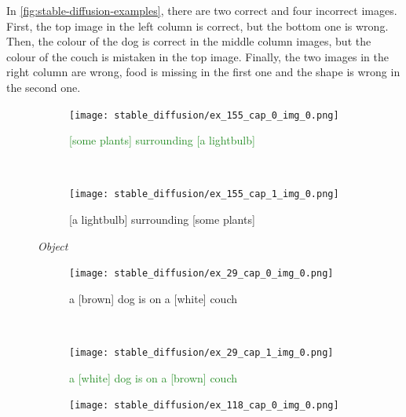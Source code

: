 In \cref{fig:stable-diffusion-examples}, there are two correct and four incorrect images. First, the top image in the left column is correct, but the bottom one is wrong. Then, the colour of the dog is correct in the middle column images, but the colour of the couch is mistaken in the top image. Finally, the two images in the right column are wrong, food is missing in the first one and the shape is wrong in the second one.

\begin{figure}[ht]
\centering
    \begin{minipage}[t]{.30\textwidth}
        \begin{subfigure}[t]{\textwidth}
        \centering
        \texttt{[image: stable\_diffusion/ex\_155\_cap\_0\_img\_0.png]}
        \caption{\textcolor{ForestGreen}{[some plants] surrounding [a lightbulb] \cmark}}
        \end{subfigure}\\
        \begin{subfigure}[t]{\textwidth}
        \centering
        \texttt{[image: stable\_diffusion/ex\_155\_cap\_1\_img\_0.png]}
        \caption{\textcolor{BrickRed}{[a lightbulb] surrounding [some plants] \xmark}}
        \end{subfigure}%
        \caption*{\textit{Object}}
    \end{minipage}
    \hfill
    \begin{minipage}[t]{.30\textwidth}
        \begin{subfigure}[t]{\textwidth}
        \centering
        \texttt{[image: stable\_diffusion/ex\_29\_cap\_0\_img\_0.png]}
        \caption{\textcolor{BrickRed}{a [brown] dog is on a [white] couch \xmark}}
        \end{subfigure}\\
        \begin{subfigure}[t]{\textwidth}
        \centering
        \texttt{[image: stable\_diffusion/ex\_29\_cap\_1\_img\_0.png]}
        \caption{\textcolor{ForestGreen}{a [white] dog is on a [brown] couch \cmark}}
        \end{subfigure}%
        \caption*{\textit{Relation}}
    \end{minipage}
    \hfill
    \begin{minipage}[t]{.30\textwidth}
        \begin{subfigure}[t]{\textwidth}
        \centering
        \texttt{[image: stable\_diffusion/ex\_118\_cap\_0\_img\_0.png]}

\end{subfigure}
\end{minipage}
\end{figure}
